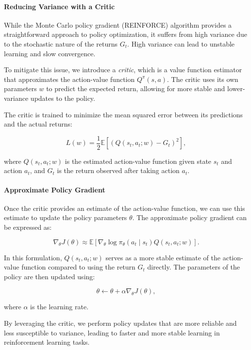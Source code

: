 \documentclass[10pt, oneside]{article}
\theoremstyle{definition}
\begin{document}
\paragraph{Reducing Variance with a Critic}

While the Monte Carlo policy gradient (REINFORCE) algorithm provides a straightforward approach to policy optimization, it suffers from high variance due to the stochastic nature of the returns \( G_t \). High variance can lead to unstable learning and slow convergence.

To mitigate this issue, we introduce a \textit{critic}, which is a value function estimator that approximates the action-value function \( Q^\pi(s, a) \). The critic uses its own parameters \( w \) to predict the expected return, allowing for more stable and lower-variance updates to the policy.

The critic is trained to minimize the mean squared error between its predictions and the actual returns:

\[
L(w) = \frac{1}{2} \mathbb{E} \left[ \left( Q(s_t, a_t; w) - G_t \right)^2 \right],
\]

where \( Q(s_t, a_t; w) \) is the estimated action-value function given state \( s_t \) and action \( a_t \), and \( G_t \) is the return observed after taking action \( a_t \).

\paragraph{Approximate Policy Gradient}

Once the critic provides an estimate of the action-value function, we can use this estimate to update the policy parameters \( \theta \). The approximate policy gradient can be expressed as:

\[
\nabla_\theta J(\theta) \approx \mathbb{E} \left[ \nabla_\theta \log \pi_\theta(a_t \mid s_t) Q(s_t, a_t; w) \right].
\]

In this formulation, \( Q(s_t, a_t; w) \) serves as a more stable estimate of the action-value function compared to using the return \( G_t \) directly. The parameters of the policy are then updated using:

\[
\theta \leftarrow \theta + \alpha \nabla_\theta J(\theta),
\]

where \( \alpha \) is the learning rate.

By leveraging the critic, we perform policy updates that are more reliable and less susceptible to variance, leading to faster and more stable learning in reinforcement learning tasks.
\end{document}
